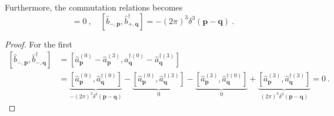     Furthermore, the commutation relations becomes 
    \begin{equation*}
        [\hat b_{-, \mathbf p}, \hat b_{-, \mathbf q}^\dagger] = 0 ~, \quad [\hat b_{-, \mathbf p}, \hat b_{+, \mathbf q}^\dagger] = - (2\pi)^3 \delta^3 (\mathbf p - \mathbf q) ~.
    \end{equation*}
    \begin{proof}
        For the first 
        \begin{equation*}
        \begin{aligned}
            [\hat b_{-, \mathbf p}, \hat b_{-, \mathbf q}^\dagger] & = [\hat a^{(0)}_{\mathbf p} - \hat a^{(3)}_{\mathbf p}, \hat a^{\dagger(0)}_{\mathbf q} - \hat a^{\dagger(3)}_{\mathbf q}] \\ & = \underbrace{[\hat a^{(0)}_{\mathbf p} , \hat a^{\dagger(0)}_{\mathbf q}]}_{-(2\pi)^3 \delta^3 (\mathbf p - \mathbf q)} - \underbrace{[\hat a^{(0)}_{\mathbf p} , \hat a^{\dagger(3)}_{\mathbf q}] }_0 - \underbrace{[\hat a^{(3)}_{\mathbf p}, \hat a^{\dagger(0)}_{\mathbf q}]}_0 + \underbrace{[\hat a^{(3)}_{\mathbf p}, \hat a^{\dagger(3)}_{\mathbf q}]}_{(2\pi)^3 \delta^3 (\mathbf p - \mathbf q)} = 0 ~.
        \end{aligned}
        \end{equation*}
    \end{proof}

